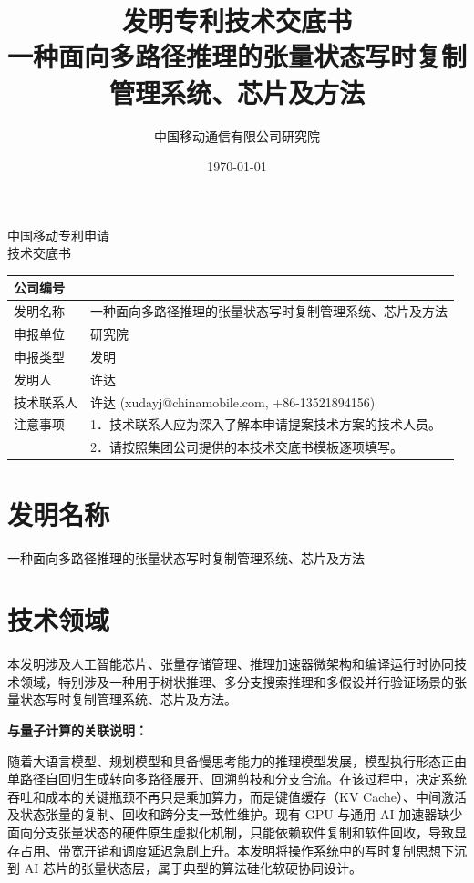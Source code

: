 \documentclass[12pt,a4paper]{article}
\title{\textbf{发明专利技术交底书} \\[0.5em]
\Large 一种面向多路径推理的张量状态写时复制管理系统、芯片及方法}
\author{中国移动通信有限公司研究院}
\date{\today}
\begin{document}
\begin{center}
    {\Large\heiti 中国移动专利申请} \\[1em]
    {\Huge\heiti 技术交底书} \\[1em]
\end{center}

\noindent
\begin{tabular}{|p{3cm}|p{12cm}|}
\hline
公司编号 &  \\
\hline
发明名称 & 一种面向多路径推理的张量状态写时复制管理系统、芯片及方法 \\
\hline
申报单位 & 研究院 \\
\hline
申报类型 & 发明 \\
\hline
发明人 & 许达 \\
\hline
技术联系人 & 许达 (xudayj@chinamobile.com, +86-13521894156) \\
\hline
注意事项 & 1．技术联系人应为深入了解本申请提案技术方案的技术人员。 \\
         & 2．请按照集团公司提供的本技术交底书模板逐项填写。 \\
\hline
\end{tabular}

\vspace{1cm}

\section{发明名称}

一种面向多路径推理的张量状态写时复制管理系统、芯片及方法


\section{技术领域}

本发明涉及人工智能芯片、张量存储管理、推理加速器微架构和编译运行时协同技术领域，特别涉及一种用于树状推理、多分支搜索推理和多假设并行验证场景的张量状态写时复制管理系统、芯片及方法。

\textbf{与量子计算的关联说明：}

随着大语言模型、规划模型和具备慢思考能力的推理模型发展，模型执行形态正由单路径自回归生成转向多路径展开、回溯剪枝和分支合流。在该过程中，决定系统吞吐和成本的关键瓶颈不再只是乘加算力，而是键值缓存（KV Cache）、中间激活及状态张量的复制、回收和跨分支一致性维护。现有 GPU 与通用 AI 加速器缺少面向分支张量状态的硬件原生虚拟化机制，只能依赖软件复制和软件回收，导致显存占用、带宽开销和调度延迟急剧上升。本发明将操作系统中的写时复制思想下沉到 AI 芯片的张量状态层，属于典型的算法硅化软硬协同设计。
\end{document}
